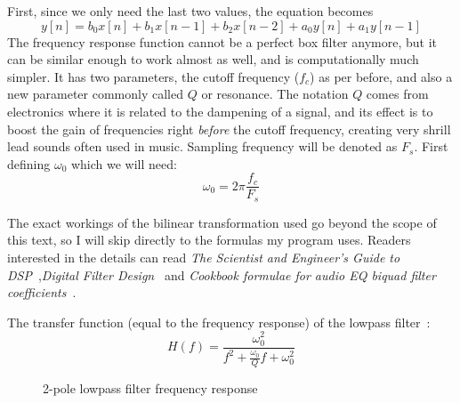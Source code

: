 \documentclass[11pt,a4paper]{article}
\begin{document}
First, since we only need the last two values, the equation becomes
\begin{equation}
y[n] = b_0x[n] + b_1x[n-1] + b_2x[n-2] + a_0y[n] + a_1y[n-1]
\end{equation}
The frequency response function cannot be a perfect box filter anymore, but it can be similar enough to work almost as well, and is computationally much simpler.
It has two parameters, the cutoff frequency (\(f_c\)) as per before, and also a new parameter commonly called \(Q\) or resonance. The notation $Q$ comes from electronics where it is related to the dampening of a signal, and its effect is to boost the gain of frequencies right \emph{before} the cutoff frequency, creating very shrill lead sounds often used in music.
Sampling frequency will be denoted as \(F_s\).
First defining $\omega_0$ which we will need:
\begin{equation}
\omega_0 = 2{\pi}\frac{f_c}{F_s}
\end{equation}

The exact workings of the bilinear transformation used go beyond the scope of this text, so I will skip directly to the formulas my program uses. Readers interested in the details can read \emph{The Scientist and Engineer's Guide to DSP}~\cite[chap. 33]{SmithDSP},\emph{Digital Filter Design}~\cite[chap. 3.5]{ZoranDFD} and \emph{Cookbook formulae for audio EQ biquad filter coefficients}~\cite{Cookbook}.

The transfer function (equal to the frequency response) of the lowpass filter~\cite[section 8.2]{LinearCircuit}:
\begin{equation}
H(f) = \frac{\omega_0^2}{f^2 + \frac{\omega_0}{Q}f + \omega_0^2}
\end{equation}



\begin{figure}[ht]
\caption{2-pole lowpass filter frequency response}
\centering
{}

\end{figure}
\end{document}
